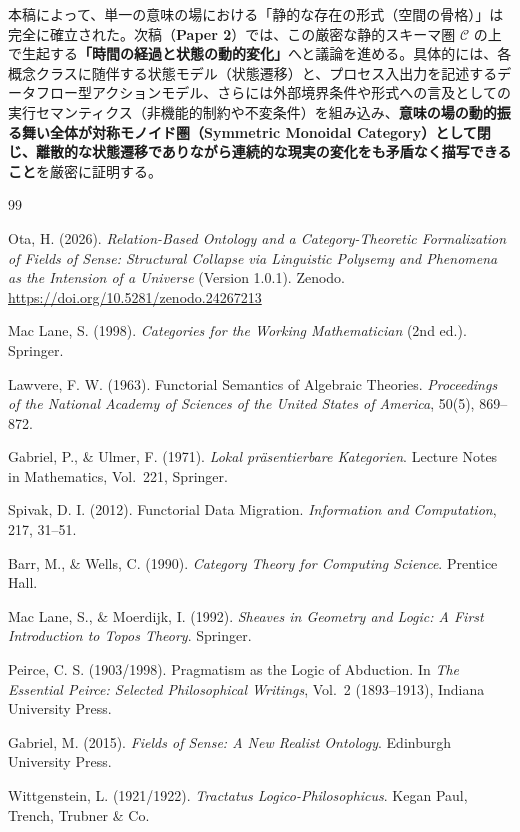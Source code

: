 \documentclass[11pt,a4paper]{ltjsarticle}
\theoremstyle{definition}
\theoremstyle{plain}
\theoremstyle{remark}
\begin{document}
本稿によって、単一の意味の場における「静的な存在の形式（空間の骨格）」は完全に確立された。次稿（\textbf{Paper 2}）では、この厳密な静的スキーマ圏 $\mathcal{C}$ の上で生起する\textbf{「時間の経過と状態の動的変化」}へと議論を進める。具体的には、各概念クラスに随伴する状態モデル（状態遷移）と、プロセス入出力を記述するデータフロー型アクションモデル、さらには外部境界条件や形式への言及としての実行セマンティクス（非機能的制約や不変条件）を組み込み、\textbf{意味の場の動的振る舞い全体が対称モノイド圏（Symmetric Monoidal Category）として閉じ、離散的な状態遷移でありながら連続的な現実の変化をも矛盾なく描写できること}を厳密に証明する。

\begin{thebibliography}{99}

Ota, H. (2026).
\emph{Relation-Based Ontology and a Category-Theoretic Formalization of Fields of Sense: Structural Collapse via Linguistic Polysemy and Phenomena as the Intension of a Universe} (Version 1.0.1).
Zenodo. \url{https://doi.org/10.5281/zenodo.24267213}

Mac Lane, S. (1998).
\emph{Categories for the Working Mathematician} (2nd ed.).
Springer.

Lawvere, F. W. (1963).
Functorial Semantics of Algebraic Theories.
\emph{Proceedings of the National Academy of Sciences of the United States of America}, 50(5), 869--872.

Gabriel, P., \& Ulmer, F. (1971).
\emph{Lokal pr\"asentierbare Kategorien}.
Lecture Notes in Mathematics, Vol.~221, Springer.

Spivak, D. I. (2012).
Functorial Data Migration.
\emph{Information and Computation}, 217, 31--51.

Barr, M., \& Wells, C. (1990).
\emph{Category Theory for Computing Science}.
Prentice Hall.

Mac Lane, S., \& Moerdijk, I. (1992).
\emph{Sheaves in Geometry and Logic: A First Introduction to Topos Theory}.
Springer.

Peirce, C. S. (1903/1998).
Pragmatism as the Logic of Abduction.
In \emph{The Essential Peirce: Selected Philosophical Writings}, Vol.~2 (1893--1913), Indiana University Press.

Gabriel, M. (2015).
\emph{Fields of Sense: A New Realist Ontology}.
Edinburgh University Press.

Wittgenstein, L. (1921/1922).
\emph{Tractatus Logico-Philosophicus}.
Kegan Paul, Trench, Trubner \& Co.


\end{thebibliography}
\end{document}
